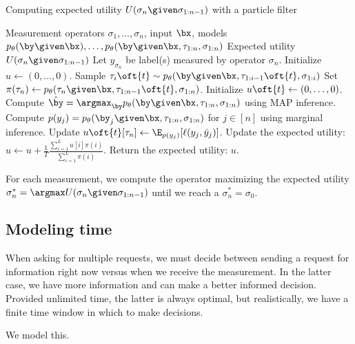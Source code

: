 \begin{algorithm}
\renewcommand{\algorithmicrequire}{\textbf{Input:}}
\renewcommand{\algorithmicensure}{\textbf{Output:}}
\caption{Computing expected utility $U(\sigma_n \given \sigma_{1:n-1})$ with a particle filter}
  \label{algo:expected-utility}
  \begin{algorithmic}[1]
    \REQUIRE Measurement operators $\sigma_1, \dots, \sigma_n$, input $\bx$, models $p_\theta(\by \given \bx), \dots, p_\theta(\by \given \bx, \tau_{1:n}, \sigma_{1:n})$
    \ENSURE Expected utility $U(\sigma_n \given \sigma_{1:n-1})$
    \STATE Let $y_{\sigma_n}$ be label(s) measured by operator $\sigma_n$.
    \STATE Initialize $u \gets (0, \dots, 0)$.
      \STATE Sample $\tau_i\oft{t} \sim \p(\by \given \bx, \tau_{1:i-1}\oft{t}, \sigma_{1:i})$
      \ENDFOR
      \STATE Set $\pi(\tau_n) \gets \p(\tau_n \given \bx, \tau_{1:n-1}\oft{t}, \sigma_{1:n})$.
      \STATE Initialize $u\oft{t} \gets (0, \dots, 0)$.
      \STATE Compute $\byt = \argmax_{\by} p_\theta(\by \given \bx, \tau_{1:n}, \sigma_{1:n})$ using MAP inference.
      \STATE Compute $p(y_j) = p_\theta(\by_j \given \bx, \tau_{1:n}, \sigma_{1:n})$ for $j \in [n]$ using marginal inference.
      \STATE Update $u\oft{t}[\tau_n] \gets \E_{p(y_j)}[\ell(y_j, \yt_j)]$.
      \ENDFOR
      \STATE Update the expected utility: $u \gets u + \frac{1}{T} \frac{\sum_{i=1}^L u[i] \pi(i)}{\sum_{i=1}^L \pi(i)}$.
    \ENDFOR
    \STATE Return the expected utility: $u$.
  \end{algorithmic}
\end{algorithm}

For each measurement, we compute the operator maximizing the expected utility $\sigma_n^* = \argmax U(\sigma_n \given \sigma_{1:n-1})$ until we reach a $\sigma_n^* = \sigma_0$.

\subsection{Modeling time}
\label{sec:time}

When asking for multiple requests, we must decide between sending a request for information right now versus when we receive the measurement.
In the latter case, we have more information and can make a better informed decision.
Provided unlimited time, the latter is always optimal, but realistically, we have a finite time window in which to make decisions.

We model this.


